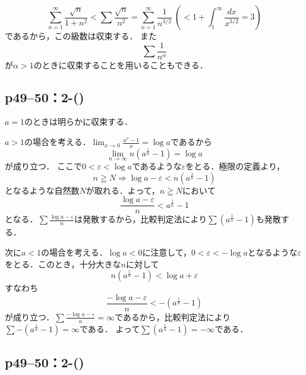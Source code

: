 \begin{tanswer}
    \[
        \sum ^{\infty}_{n=1}\frac{\sqrt{n}}{1+n^2}<\sum \frac{\sqrt{n}}{n^2}=\sum^{\infty}_{n=1}\frac{1}{n^{3/2}}~\left(<1+\int^{\infty}_{1}\frac{dx}{x^{3/2}}=3\right)
    \]
    であるから，この級数は収束する．
    また
    \[
        \sum \frac{1}{n^\alpha}
    \]
    が$\alpha >1$のときに収束することを用いることもできる．
\end{tanswer}


\subsection*{p49--50：2-()}

\begin{tanswer}
    $a=1$のときは明らかに収束する．

    $a>1$の場合を考える．$\lim_{x \to 0} \frac{a^x-1}{x} = \log a$であるから
    \[
        \lim_{n \to \infty} n(a^{\frac{1}{n}}-1) = \log a
    \]
    が成り立つ．
    ここで$0 < \varepsilon <\log a$であるような$\varepsilon$をとる．極限の定義より，
    \[
        n \geqq N \Longrightarrow \log a - \varepsilon < n (a^\frac{1}{n}-1)
    \]
    となるような自然数$N$が取れる．よって，$n \geqq N$において
    \[
        \frac{\log a - \varepsilon}{n} < a^\frac{1}{n}-1
    \]
    となる．$\sum \frac{\log a - \varepsilon}{n}$は発散するから，比較判定法により$\sum (a^{\frac{1}{n}}-1)$も発散する．

    次に$ a<1$の場合を考える．$\log a <0$に注意して，$0 < \varepsilon <-\log a $となるような$\varepsilon$をとる．このとき，十分大きな$n$に対して
    \[
        n (a^\frac{1}{n}-1) < \log a + \varepsilon
    \]
    すなわち
    \[
        \frac{-\log a - \varepsilon}{n} < -(a^\frac{1}{n}-1)
    \]
    が成り立つ．$\sum \frac{-\log a - \varepsilon}{n}=\infty$であるから，比較判定法により$\sum -(a^{\frac{1}{n}}-1)=\infty$である．
    よって$\sum (a^{\frac{1}{n}}-1)=-\infty$である．
\end{tanswer}


\subsection*{p49--50：2-()}

